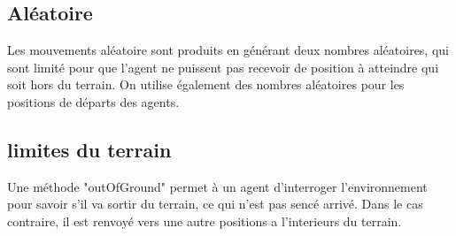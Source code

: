 \subsection{Aléatoire}
Les mouvements aléatoire sont produits en générant deux nombres
aléatoires, qui sont limité pour que l'agent ne puissent pas recevoir
de position à atteindre qui soit hors du terrain.  On utilise
également des nombres aléatoires pour les positions de départs des
agents.

\subsection{limites du terrain}

Une méthode "outOfGround" permet à un agent d'interroger
l'environnement pour savoir s'il va sortir du terrain, ce qui n'est
pas sencé arrivé. Dans le cas contraire, il est renvoyé vers une autre
positions a l'interieurs du terrain.
